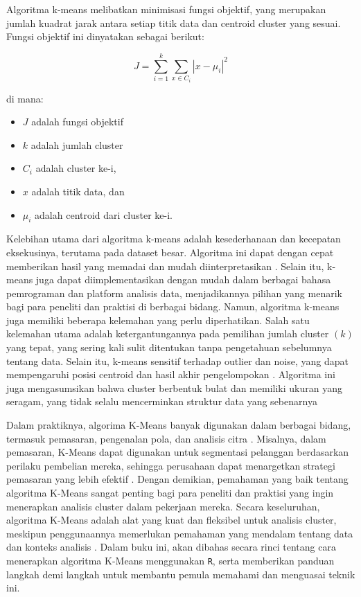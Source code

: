 \documentclass[
  oneside]{book}
\begin{document}
Algoritma k-means melibatkan minimisasi fungsi objektif, yang merupakan jumlah kuadrat jarak antara setiap titik data dan centroid cluster yang sesuai. Fungsi objektif ini dinyatakan sebagai berikut:

\[ J = \sum_{i=1}^{k} \sum_{x \in C_i} | x - \mu_i |^2 \]

di mana:

\begin{itemize}
\item
  \(J\) adalah fungsi objektif
\item
  \(k\) adalah jumlah cluster
\item
  \(C_i\) adalah cluster ke-i,
\item
  \(x\) adalah titik data, dan
\item
  \(\mu_i\) adalah centroid dari cluster ke-i.
\end{itemize}

Kelebihan utama dari algoritma k-means adalah kesederhanaan dan kecepatan eksekusinya, terutama pada dataset besar. Algoritma ini dapat dengan cepat memberikan hasil yang memadai dan mudah diinterpretasikan \citep{han2011data}. Selain itu, k-means juga dapat diimplementasikan dengan mudah dalam berbagai bahasa pemrograman dan platform analisis data, menjadikannya pilihan yang menarik bagi para peneliti dan praktisi di berbagai bidang. Namun, algoritma k-means juga memiliki beberapa kelemahan yang perlu diperhatikan. Salah satu kelemahan utama adalah ketergantungannya pada pemilihan jumlah cluster \((k)\) yang tepat, yang sering kali sulit ditentukan tanpa pengetahuan sebelumnya tentang data. Selain itu, k-means sensitif terhadap outlier dan noise, yang dapat mempengaruhi posisi centroid dan hasil akhir pengelompokan \citep{elbow1975outline}. Algoritma ini juga mengasumsikan bahwa cluster berbentuk bulat dan memiliki ukuran yang seragam, yang tidak selalu mencerminkan struktur data yang sebenarnya

Dalam praktiknya, algorima K-Means banyak digunakan dalam berbagai bidang, termasuk pemasaran, pengenalan pola, dan analisis citra \citep{xu2005survey}. Misalnya, dalam pemasaran, K-Means dapat digunakan untuk segmentasi pelanggan berdasarkan perilaku pembelian mereka, sehingga perusahaan dapat menargetkan strategi pemasaran yang lebih efektif \citep{kumar2016creating}. Dengan demikian, pemahaman yang baik tentang algoritma K-Means sangat penting bagi para peneliti dan praktisi yang ingin menerapkan analisis cluster dalam pekerjaan mereka. Secara keseluruhan, algoritma K-Means adalah alat yang kuat dan fleksibel untuk analisis cluster, meskipun penggunaannya memerlukan pemahaman yang mendalam tentang data dan konteks analisis \citep{bishop2006pattern}. Dalam buku ini, akan dibahas secara rinci tentang cara menerapkan algoritma K-Means menggunakan \texttt{R}, serta memberikan panduan langkah demi langkah untuk membantu pemula memahami dan menguasai teknik ini.
\end{document}
